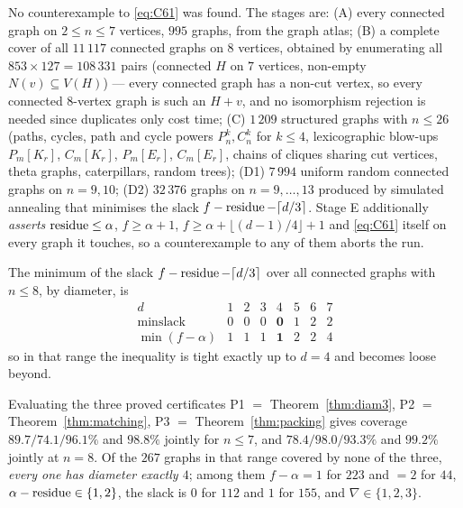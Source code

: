 \begin{remark}\label{rem:falsify}
No counterexample to \eqref{eq:C61} was found. The stages are: (A) every connected graph on
$2 \le n \le 7$ vertices, $995$ graphs, from the graph atlas; (B) a complete cover of all
$11\,117$ connected graphs on $8$ vertices, obtained by enumerating all
$853 \times 127 = 108\,331$ pairs (connected $H$ on $7$ vertices, non-empty
$N(v) \subseteq V(H)$) --- every connected graph has a non-cut vertex, so every connected
$8$-vertex graph is such an $H + v$, and no isomorphism rejection is needed since duplicates
only cost time; (C) $1\,209$ structured graphs with $n \le 26$ (paths, cycles, path and
cycle powers $P_n^k, C_n^k$ for $k \le 4$, lexicographic blow-ups $P_m[K_r]$, $C_m[K_r]$,
$P_m[E_r]$, $C_m[E_r]$, chains of cliques sharing cut vertices, theta graphs, caterpillars,
random trees); (D1) $7\,994$ uniform random connected graphs on $n = 9,10$; (D2) $32\,376$
graphs on $n = 9,\dots,13$ produced by simulated annealing that minimises the slack
$f - \operatorname{residue} - \lceil d/3 \rceil$. Stage E additionally \emph{asserts} $\operatorname{residue} \le \alpha$,
$f \ge \alpha+1$, $f \ge \alpha + \lfloor (d-1)/4 \rfloor + 1$ and \eqref{eq:C61} itself on
every graph it touches, so a counterexample to any of them aborts the run.
\end{remark}

The minimum of the slack $f - \operatorname{residue} - \lceil d/3 \rceil$ over all connected graphs with
$n \le 8$, by diameter, is
\[
\begin{array}{c|ccccccc}
d & 1 & 2 & 3 & 4 & 5 & 6 & 7\\ \hline
\min \text{slack} & 0 & 0 & 0 & \mathbf{0} & 1 & 2 & 2\\
\min (f-\alpha) & 1 & 1 & 1 & \mathbf{1} & 2 & 2 & 4
\end{array}
\]
so in that range the inequality is tight exactly up to $d = 4$ and becomes loose beyond.

\begin{remark}\label{rem:coverage}
Evaluating the three proved certificates P1 $=$ Theorem~\ref{thm:diam3},
P2 $=$ Theorem~\ref{thm:matching}, P3 $=$ Theorem~\ref{thm:packing} gives coverage
$89.7 / 74.1 / 96.1\%$ and $98.8\%$ jointly for $n \le 7$, and
$78.4 / 98.0 / 93.3\%$ and $99.2\%$ jointly at $n = 8$. Of the $267$ graphs in that range
covered by none of the three, \emph{every one has diameter exactly $4$}; among them
$f - \alpha = 1$ for $223$ and $= 2$ for $44$, $\alpha - \operatorname{residue} \in \{1,2\}$, the slack is $0$
for $112$ and $1$ for $155$, and $\nabla \in \{1,2,3\}$.
\end{remark}

